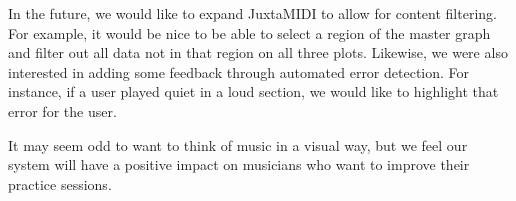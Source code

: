 \documentclass[journal]{vgtc}                %
\begin{document}
In the future, we would like to expand JuxtaMIDI to allow for content filtering.
For example, it would be nice to be able to select a region of the master graph
and filter out all data not in that region on all three plots. Likewise, we
were also interested in adding some feedback through automated error detection.
For instance, if a user played quiet in a loud section, we would like to
highlight that error for the user.

It may seem odd to want to think of music in a visual way, but we feel our
system will have a positive impact on musicians who want to improve their
practice sessions.

\printbibliography
\end{document}
